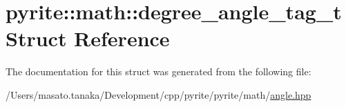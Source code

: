 \hypertarget{structpyrite_1_1math_1_1degree__angle__tag__t}{}\section{pyrite\+:\+:math\+:\+:degree\+\_\+angle\+\_\+tag\+\_\+t Struct Reference}
\label{structpyrite_1_1math_1_1degree__angle__tag__t}


The documentation for this struct was generated from the following file\+:\begin{DoxyCompactItemize}
\item 
/\+Users/masato.\+tanaka/\+Development/cpp/pyrite/pyrite/math/\mbox{\hyperlink{angle_8hpp}{angle.\+hpp}}\end{DoxyCompactItemize}
